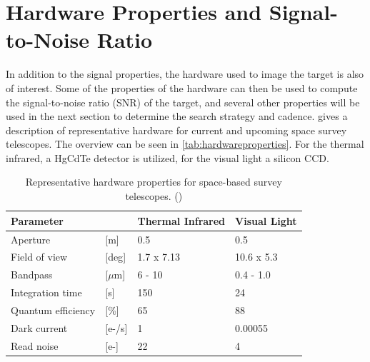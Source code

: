 \section{Hardware Properties and Signal-to-Noise Ratio}
\label{sec:modelling_hardware_SNR}

In addition to the signal properties, the hardware used to image the target is also of interest. Some of the properties of the hardware can then be used to compute the signal-to-noise ratio (SNR) of the target, and several other properties will be used in the next section to determine the search strategy and cadence. \cite{2017NEOSDT} gives a description of representative hardware for current and upcoming space survey telescopes. The overview can be seen in \autoref{tab:hardwareproperties}. For the thermal infrared, a HgCdTe detector is utilized, for the visual light a silicon CCD. \\

\begin{table}[htbp]
\centering
\caption{Representative hardware properties for space-based survey telescopes. (\cite{2017NEOSDT})}
\label{tab:hardwareproperties}
\begin{tabular}{ll|ll}
\textbf{Parameter}        &  & \textbf{Thermal Infrared} & \textbf{Visual Light} \\ \hline
Aperture &{[}m{]}            & 0.5                       & 0.5                   \\
Field of view &{[}deg{]}     & 1.7 x 7.13                & 10.6 x 5.3            \\
Bandpass &{[}$\mu$m{]}       & 6 - 10                    & 0.4 - 1.0             \\
Integration time &{[}s{]}    & 150                       & 24                    \\
Quantum efficiency &{[}\%{]} & 65                        & 88                    \\
Dark current &{[}e-/s{]}     & 1                         & 0.00055               \\
Read noise &{[}e-{]}         & 22                        & 4
\end{tabular}
\end{table}


